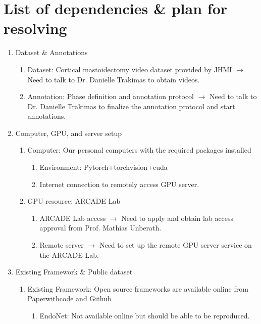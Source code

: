 \documentclass[11pt]{article} \usepackage[top=1in, bottom=1in, left=1in, right=1in]{geometry}
\begin{document}
\section{List of dependencies \& plan for resolving}
\begin{enumerate}
    \item Dataset \& Annotations
          \begin{enumerate}
              \item Dataset: Cortical mastoidectomy video dataset provided by JHMI $\rightarrow$ Need to talk to Dr. Danielle Trakimas to obtain videos.
              \item Annotation: Phase definition and annotation protocol $\rightarrow$ Need to talk to Dr. Danielle Trakimas to finalize the annotation protocol and start annotations.
          \end{enumerate}
    \item Computer, GPU, and server setup
          \begin{enumerate}
              \item Computer: Our personal computers with the required packages installed
                    \begin{enumerate}
                        \item Environment: Pytorch+torchvision+cuda
                        \item Internet connection to remotely access GPU server.
                    \end{enumerate}
              \item GPU resource: ARCADE Lab
                    \begin{enumerate}
                        \item ARCADE Lab access $\rightarrow$ Need to apply and obtain lab access approval from Prof. Mathias Unberath.
                        \item Remote server $\rightarrow$ Need to set up the remote GPU server service on the ARCADE Lab.
                    \end{enumerate}
          \end{enumerate}
    \item Existing Framework \& Public dataset
          \begin{enumerate}
              \item Existing Framework: Open source frameworks are available online from Paperwithcode and Github
                    \begin{enumerate}
                        \item EndoNet: Not available online but should be able to be reproduced.

\end{enumerate}
\end{enumerate}
\end{enumerate}
\end{document}
